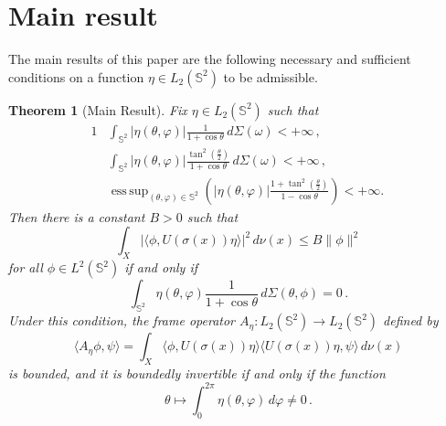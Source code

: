 \documentclass[a4paper,11pt,DIV=11,%
abstract=on%
]{scrartcl}
\newtheorem{thm}{Theorem}[section]
\def\SO{{\mathrm{SO}}}
\DeclareMathOperator*{\esssup}{ess\,sup}
\newcommand{\red}[1]{#1}
\begin{document}

\section{Main result} \label{sec:main}
The main results of this paper  are the following necessary and sufficient conditions on a function
$\eta \in L_2(\mathbb S^2)$ to be admissible.


\red{\begin{thm}[Main Result] \label{thm:main}
  Fix   $\eta\in L_2(\mathbb S^2)$ such that
\begin{alignat}{1} \label{eq:7}
    & \int_{\mathbb S^2} |\eta(\theta , \varphi)|\frac{1}{1 + \cos\theta}
    \, d\Sigma(\omega) < +\infty\, ,\\
    & \int_{\mathbb S^2} |\eta(\theta , \varphi)|\frac{
      \tan^2(\tfrac\theta2)}{1 + \cos\theta}    \,d\Sigma(\omega)
    < +\infty \, ,\label{eq:8} \\
    & \esssup_{(\theta,\varphi)\in\mathbb S^2}\left(
    |\eta(\theta,\varphi)|\frac{1+\tan^2(\tfrac\theta2)}{1-\cos\theta}\right)<+\infty.
  \, \label{eta_tilde}  
\end{alignat}
Then there is a constant $B>0$ such that
  \[
\int_X\bigl
|\bigl\langle\phi,U(\sigma(x))\eta\bigr\rangle\bigr|^2\,d\nu(x) \leq  B \|\phi\|^2
    \]
 for all $\phi\in L^2(\mathbb S^2)$ if and only if
		\begin{equation}
			\label{eq:cond-eta}
			\int_{\mathbb S^2} \eta(\theta , \varphi) \frac{1}{1 + \cos\theta}\, d\Sigma(\theta,\phi)  = 0\,.
                      \end{equation}
Under this condition, the frame operator
$A_\eta: L_2(\mathbb S^2)\to L_2(\mathbb S^2)$ defined by
		\begin{equation} \label{eq:2} 
			\langle A_\eta\phi,\psi\rangle
		=\int_X\bigl\langle\phi,U(\sigma(x))\eta\bigr\rangle
			\langle U(\sigma(x))\eta,\psi\rangle\,d\nu(x) 
		\end{equation}
is bounded, and it is boundedly invertible if and only if the function
\begin{equation}
  \label{eq:11}
  \theta \mapsto  \int_0^{2\pi}\eta(\theta,\varphi)\,d\varphi \neq 0 \, .
\end{equation}

\end{thm}}
\end{document}
